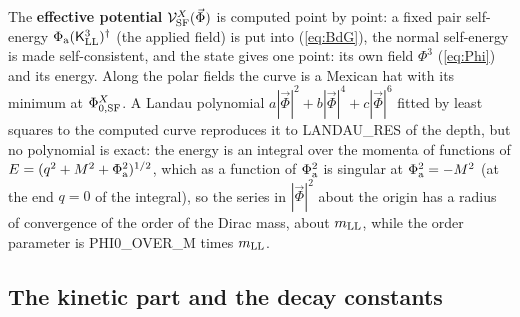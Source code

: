 \documentclass[aps,prd,onecolumn,superscriptaddress,nofootinbib,floatfix,longbibliography]{revtex4-2}
\newcommand{\LL}{{\rm LL}}
\newcommand{\SF}{{\rm SF}}
\begin{document}
The \textbf{effective potential} $\mathcal V^X_\SF(\vec\Phi)$ is computed point by point: a fixed pair self-energy
$\Phi_{\rm a}(\mathsf K^3_\LL)^\dagger$ (the applied field) is put into (\ref{eq:BdG}), the normal self-energy is made self-consistent, and
the state gives one point: its own field $\Phi^3$ (\ref{eq:Phi}) and its energy. Along the polar fields the curve is a Mexican
hat with its minimum at $\Phi^X_{0,\SF}$. A Landau polynomial $a|\vec\Phi|^2+b|\vec\Phi|^4+c|\vec\Phi|^6$ fitted by least squares to
the computed curve reproduces it to {{LANDAU_RES}} of the depth, but no polynomial is exact: the energy is an integral over
the momenta of functions of $E=(q^2+M^2+\Phi_{\rm a}^2)^{1/2}$, which as a function of $\Phi_{\rm a}^2$ is singular at
$\Phi_{\rm a}^2=-M^2$ (at the end $q=0$ of the integral), so the series in $|\vec\Phi|^2$ about the origin has a radius of
convergence of the order of the Dirac mass, about $m_\LL$, while the order parameter is {{PHI0_OVER_M}} times $m_\LL$.

\subsection{The kinetic part and the decay constants}
\end{document}
